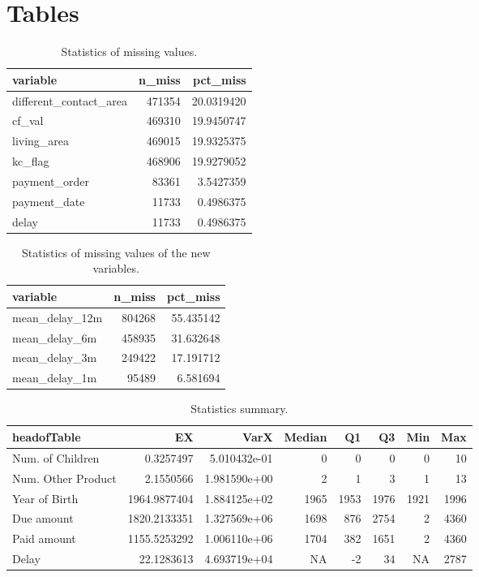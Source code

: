 \documentclass[
]{article}
\begin{document}
\hypertarget{tables}{%
\section{Tables}\label{tables}}

\begin{table}

\caption{\label{tab:Missing-stat}Statistics of missing values.}
\centering
\begin{tabular}[t]{l|r|r}
\hline
variable & n\_miss & pct\_miss\\
\hline
different\_contact\_area & 471354 & 20.0319420\\
\hline
cf\_val & 469310 & 19.9450747\\
\hline
living\_area & 469015 & 19.9325375\\
\hline
kc\_flag & 468906 & 19.9279052\\
\hline
payment\_order & 83361 & 3.5427359\\
\hline
payment\_date & 11733 & 0.4986375\\
\hline
delay & 11733 & 0.4986375\\
\hline
\end{tabular}
\end{table}

\begin{table}

\caption{\label{tab:miss-statnew}Statistics of missing values of the new variables.}
\centering
\begin{tabular}[t]{l|r|r}
\hline
variable & n\_miss & pct\_miss\\
\hline
mean\_delay\_12m & 804268 & 55.435142\\
\hline
mean\_delay\_6m & 458935 & 31.632648\\
\hline
mean\_delay\_3m & 249422 & 17.191712\\
\hline
mean\_delay\_1m & 95489 & 6.581694\\
\hline
\end{tabular}
\end{table}

\begin{table}

\caption{\label{tab:Stats}Statistics summary.}
\centering
\begin{tabular}[t]{l|r|r|r|r|r|r|r}
\hline
headofTable & EX & VarX & Median & Q1 & Q3 & Min & Max\\
\hline
Num. of Children & 0.3257497 & 5.010432e-01 & 0 & 0 & 0 & 0 & 10\\
\hline
Num. Other Product & 2.1550566 & 1.981590e+00 & 2 & 1 & 3 & 1 & 13\\
\hline
Year of Birth & 1964.9877404 & 1.884125e+02 & 1965 & 1953 & 1976 & 1921 & 1996\\
\hline
Due amount & 1820.2133351 & 1.327569e+06 & 1698 & 876 & 2754 & 2 & 4360\\
\hline
Paid amount & 1155.5253292 & 1.006110e+06 & 1704 & 382 & 1651 & 2 & 4360\\
\hline
Delay & 22.1283613 & 4.693719e+04 & NA & -2 & 34 & NA & 2787\\
\hline
\end{tabular}
\end{table}
\end{document}
